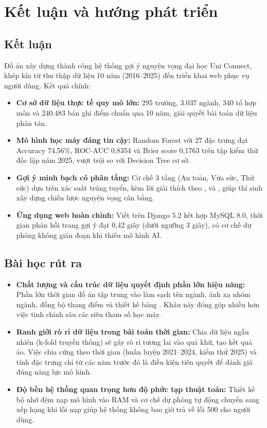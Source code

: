 \chapter{Kết luận và hướng phát triển}
\label{ch:ketluan}

\section{Kết luận}

Đồ án xây dựng thành công hệ thống gợi ý nguyện vọng đại học Uni Connect, khép kín từ thu thập dữ liệu 10 năm (2016--2025) đến triển khai web phục vụ người dùng. Kết quả chính:

\begin{itemize}[leftmargin=1.6em, itemsep=2pt]
  \item \textbf{Cơ sở dữ liệu thực tế quy mô lớn:} 295 trường, 3.037 ngành, 340 tổ hợp môn và 240.483 bản ghi điểm chuẩn qua 10 năm, giải quyết bài toán dữ liệu phân tán.
  \item \textbf{Mô hình học máy đáng tin cậy:} Random Forest với 27 đặc trưng đạt Accuracy 74,56\%, ROC-AUC 0,8354 và Brier score 0,1763 trên tập kiểm thử độc lập năm 2025, vượt trội so với Decision Tree cơ sở.
  \item \textbf{Gợi ý minh bạch có phân tầng:} Cơ chế 3 tầng (An toàn, Vừa sức, Thử sức) dựa trên xác suất trúng tuyển, kèm lời giải thích theo ,  và , giúp thí sinh xây dựng chiến lược nguyện vọng cân bằng.
  \item \textbf{Ứng dụng web hoàn chỉnh:} Viết trên Django 5.2 kết hợp MySQL 8.0, thời gian phản hồi trang gợi ý đạt 0,42 giây (dưới ngưỡng 3 giây), có cơ chế dự phòng không gián đoạn khi thiếu mô hình AI.
\end{itemize}

\section{Bài học rút ra}

\begin{itemize}[leftmargin=1.6em, itemsep=2pt]
  \item \textbf{Chất lượng và cấu trúc dữ liệu quyết định phần lớn hiệu năng:} Phần lớn thời gian đồ án tập trung vào làm sạch tên ngành, ánh xạ nhóm ngành, đồng bộ thang điểm và thiết kế bảng . Khâu này đóng góp nhiều hơn việc tinh chỉnh sâu các siêu tham số học máy.
  \item \textbf{Ranh giới rò rỉ dữ liệu trong bài toán thời gian:} Chia dữ liệu ngẫu nhiên (k-fold truyền thống) sẽ gây rò rỉ tương lai vào quá khứ, tạo kết quả ảo. Việc chia cứng theo thời gian (huấn luyện 2021--2024, kiểm thử 2025) và tính đặc trưng chỉ từ các năm trước đó là điều kiện tiên quyết để đánh giá đúng năng lực mô hình.
  \item \textbf{Độ bền hệ thống quan trọng hơn độ phức tạp thuật toán:} Thiết kế bộ nhớ đệm nạp mô hình vào RAM và cơ chế dự phòng tự động chuyển sang xếp hạng  khi lỗi nạp giúp hệ thống không bao giờ trả về lỗi 500 cho người dùng.
\end{itemize}

